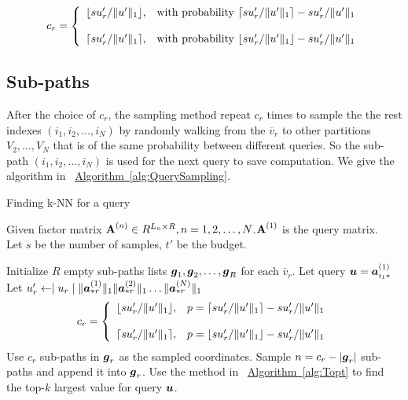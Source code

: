 \documentclass[letterpaper]{article}
\newcommand{\V}[1]{{\bm{{\MakeLowercase{#1}}}}}
\newcommand{\VnC}[3]{\V{#1}^{(#2)}_{#3}}
\newcommand{\Vacol}[1]{\V{a}^{(#1)}_{*r}}
\newcommand{\M}[1]{{\bm{\mathbf{\MakeUppercase{#1}}}}}
\newcommand{\norm}[2]{\|#1\|_{#2}}
\newcommand{\Alg}[1] {\hyperref[alg:#1] {Algorithm~\ref*{alg:#1}}}
\begin{document}
 \begin{equation*}c_r=
    \left\{
      \begin{array}{ll}
        \lfloor su'_r/\norm{u'}{1} \rfloor,
        & \hbox{with probability $\lceil su'_r/\norm{u'}{1} \rceil - su'_r/\norm{u'}{1}$} \\\\
        \lceil su'_r/\norm{u'}{1} \rceil,
        & \hbox{with probability $\lfloor su'_r/\norm{u'}{1} \rfloor - su'_r/\norm{u'}{1}$}
      \end{array}
    \right.
    \end{equation*}

\subsection{Sub-paths}
After the choice of $c_r$, the sampling method repeat $c_r$ times to sample the the rest indexes $(i_1,i_2,\ldots,i_N)$ by randomly walking from the $\overline{v}_r$ to other partitions $V_2,\ldots,V_N$ that is of the same probability between different queries. So the sub-path $(i_1,i_2,\ldots,i_N)$ is used for the next query to save computation. We give the algorithm in ~\Alg{QuerySampling}.


\begin{algorithm}[t]
    \caption{Finding k-NN for a query}
    \label{alg:QuerySampling}
        Given factor matrix $\M{A}^{(n)}\in R^{L_n\times R}, n = 1,2,\ldots,N$.$\M{A}^{(1)}$ is the query matrix.\\
        Let $s$ be the number of samples, $t'$ be the budget.
    \begin{algorithmic}[1]
    \State Initialize $R$ empty sub-paths lists $\V{g}_1,\V{g}_2,\ldots,\V{g}_R$ for each $\overline{v}_r$.
    \State Let query $\V{u}=\VnC{a}{1}{i_1*}$
    \State Let $u'_r \leftarrow \mid u_r\mid \norm{\Vacol{1}}{1} \norm{\Vacol{2}}{1} \ldots \norm{\Vacol{N}}{1}$
    \EndFor
    \State
    \begin{equation*}c_r=
        \left\{
          \begin{array}{ll}
            \lfloor su'_r/\norm{u'}{1} \rfloor,
            & \hbox{$p=\lceil su'_r/\norm{u'}{1} \rceil - su'_r/\norm{u'}{1}$} \\\\
            \lceil su'_r/\norm{u'}{1} \rceil,
            & \hbox{$p=\lfloor su'_r/\norm{u'}{1} \rfloor - su'_r/\norm{u'}{1}$}
          \end{array}
        \right.
    \end{equation*}
    \EndFor
    \If {$c_r\leq |\V{g}_r|$ }
    \State Use $c_r$ sub-paths in $\V{g}_r$ as the sampled coordinates.
    \Else
    \State Sample $n = c_r - |\V{g}_r|$ sub-paths and append it into $\V{g}_r$.
    \EndIf
    \State Use the method in ~\Alg{Topt} to find the top-$k$ largest value for query $\V{u}$.
    \EndFor
    \EndFor
    \end{algorithmic}
\end{algorithm}
\end{document}
